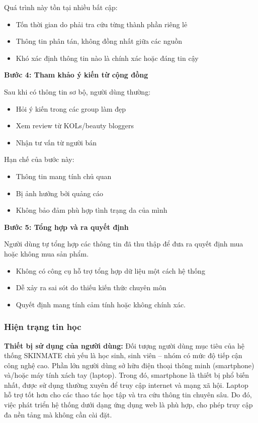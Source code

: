\documentclass[12pt,a4paper]{article}
\begin{document}
Quá trình này tồn tại nhiều bất cập:

\begin{itemize}
    \item Tốn thời gian do phải tra cứu từng thành phần riêng lẻ
    \item Thông tin phân tán, không đồng nhất giữa các nguồn
    \item Khó xác định thông tin nào là chính xác hoặc đáng tin cậy
\end{itemize}

\textbf{Bước 4: Tham khảo ý kiến từ cộng đồng}

Sau khi có thông tin sơ bộ, người dùng thường:
\begin{itemize}
    \item Hỏi ý kiến trong các group làm đẹp
    \item Xem review từ KOLs/beauty bloggers
    \item Nhận tư vấn từ người bán
\end{itemize}

Hạn chế của bước này:
\begin{itemize}
    \item Thông tin mang tính chủ quan
    \item Bị ảnh hưởng bởi quảng cáo
    \item Không bảo đảm phù hợp tình trạng da của mình
\end{itemize}


\textbf{Bước 5: Tổng hợp và ra quyết định}

Người dùng tự tổng hợp các thông tin đã thu thập để đưa ra quyết định mua hoặc không mua sản phẩm.

\begin{itemize}
    \item Không có công cụ hỗ trợ tổng hợp dữ liệu một cách hệ thống
    \item Dễ xảy ra sai sót do thiếu kiến thức chuyên môn
    \item Quyết định mang tính cảm tính hoặc không chính xác.
\end{itemize}



\subsubsection{Hiện trạng tin học}

\textbf{Thiết bị sử dụng của người dùng:}  
Đối tượng người dùng mục tiêu của hệ thống SKINMATE chủ yếu là học sinh, sinh viên – nhóm có mức độ tiếp cận công nghệ cao. Phần lớn người dùng sở hữu điện thoại thông minh (smartphone) và/hoặc máy tính xách tay (laptop). Trong đó, smartphone là thiết bị phổ biến nhất, được sử dụng thường xuyên để truy cập internet và mạng xã hội. Laptop hỗ trợ tốt hơn cho các thao tác học tập và tra cứu thông tin chuyên sâu. Do đó, việc phát triển hệ thống dưới dạng ứng dụng web là phù hợp, cho phép truy cập đa nền tảng mà không cần cài đặt.
\end{document}

